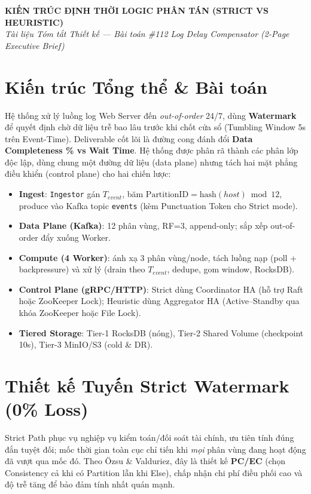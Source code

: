 \documentclass[9pt,a4paper]{article}
\begin{document}
\begin{center}
    \large\textbf{KIẾN TRÚC ĐỊNH THỜI LOGIC PHÂN TÁN (STRICT VS HEURISTIC)} \\
    \small\textit{Tài liệu Tóm tắt Thiết kế --- Bài toán \#112 Log Delay Compensator (2-Page Executive Brief)}
\end{center}

\section{Kiến trúc Tổng thể \& Bài toán}
Hệ thống xử lý luồng log Web Server đến \emph{out-of-order} 24/7, dùng \textbf{Watermark} để quyết định chờ dữ liệu trễ bao lâu trước khi chốt cửa sổ (Tumbling Window 5s trên Event-Time). Deliverable cốt lõi là đường cong đánh đổi \textbf{Data Completeness \% vs Wait Time}. Hệ thống được phân rã thành các phân lớp độc lập, dùng chung một đường dữ liệu (data plane) nhưng tách hai mặt phẳng điều khiển (control plane) cho hai chiến lược:

\begin{itemize}[leftmargin=*]
    \item \textbf{Ingest}: \texttt{Ingestor} gán $T_{event}$, băm $\text{PartitionID}=\text{hash}(host)\bmod 12$, produce vào Kafka topic \texttt{events} (kèm Punctuation Token cho Strict mode).
    \item \textbf{Data Plane (Kafka)}: 12 phân vùng, RF=3, append-only; sắp xếp out-of-order đẩy xuống Worker.
    \item \textbf{Compute (4 Worker)}: ánh xạ 3 phân vùng/node, tách luồng nạp (poll + backpressure) và xử lý (drain theo $T_{event}$, dedupe, gom window, RocksDB).
    \item \textbf{Control Plane (gRPC/HTTP)}: Strict dùng Coordinator HA (hỗ trợ Raft hoặc ZooKeeper Lock); Heuristic dùng Aggregator HA (Active--Standby qua khóa ZooKeeper hoặc File Lock).
    \item \textbf{Tiered Storage}: Tier-1 RocksDB (nóng), Tier-2 Shared Volume (checkpoint 10s), Tier-3 MinIO/S3 (cold \& DR).
\end{itemize}

\section{Thiết kế Tuyến Strict Watermark (0\% Loss)}
Strict Path phục vụ nghiệp vụ kiểm toán/đối soát tài chính, ưu tiên tính đúng đắn tuyệt đối; mốc thời gian toàn cục chỉ tiến khi \emph{mọi} phân vùng đang hoạt động đã vượt qua mốc đó. Theo Özsu \& Valduriez, đây là thiết kế \textbf{PC/EC} (chọn Consistency cả khi có Partition lẫn khi Else), chấp nhận chi phí điều phối cao và độ trễ tăng để bảo đảm tính nhất quán mạnh.
\end{document}
